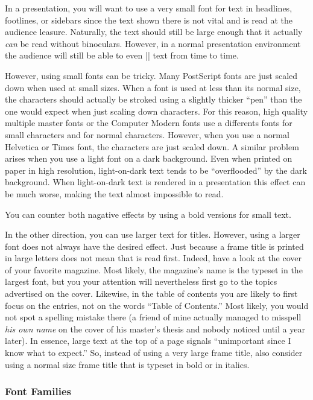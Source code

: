 In a presentation, you will want to use a very small font for text in
headlines, footlines, or sidebars since the text shown there is not
vital and is read at the audience leasure. Naturally, the text should
still be large enough that it actually \emph{can} be read without
binoculars. However, in a normal presentation environment the audience
will still be able to even |\tiny| text from time to time.

However, using small fonts can be tricky. Many PostScript fonts are
just scaled down when used at small sizes. When a font is
used at less than its normal size, the characters should actually be
stroked using a slightly thicker ``pen'' than the one would expect
when just scaling down characters. For this reason, high quality
multiple master fonts or the Computer Modern fonts use a differents
fonts for small characters and for normal characters. However, when
you use a normal Helvetica or Times font, the characters are just
scaled down. A similar problem arises when you use a light font on a
dark background. Even when printed on paper in high resolution,
light-on-dark text tends to be ``overflooded'' by the dark
background. When light-on-dark text is rendered in a presentation this
effect can be much worse, making the text almost impossible to read.

You can counter both nagative effects by using a bold versions for
small text.

In the other direction, you can use larger text for titles. However,
using a larger font does not always have the desired effect. Just
because a frame title is printed in large letters does not
mean that is read first. Indeed, have a look at the cover of your
favorite magazine. Most likely, the magazine's name is the typeset in the
largest font, but you your attention will nevertheless first go to the
topics advertised on the cover. Likewise, in the table of contents you
are likely to first focus on the entries, not on the words ``Table of
Contents.'' Most likely, you would not spot a spelling mistake there
(a friend of mine actually managed to misspell \emph{his own name} on
the cover of his master's thesis and nobody noticed until a year
later). In essence, large text at the top of a page signals
``unimportant since I know what to expect.'' So, instead of using a
very large frame title, also consider using a normal size frame title
that is typeset in bold or in italics. 





\subsubsection{Font Families}

